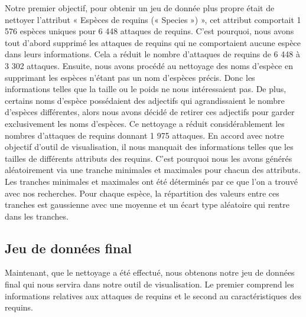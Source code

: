 \documentclass{article}
\begin{document}
Notre premier objectif, pour obtenir un jeu de donnée plus propre était de nettoyer l’attribut « Espèces de requins (« Species ») », cet attribut comportait 1 576 espèces uniques pour 6 448 attaques de requins.
C’est pourquoi, nous avons tout d’abord supprimé les attaques de requins qui ne comportaient aucune espèce dans leurs informations. Cela a réduit le nombre d’attaques de requins de 6 448 à 3 302 attaques.
Ensuite, nous avons procédé au nettoyage des noms d’espèce en supprimant les espèces n’étant pas un nom d’espèces précis. Donc les informations telles que la taille ou le poids ne nous intéressaient pas.
De plus, certains noms d’espèce possédaient des adjectifs qui agrandissaient le nombre d’espèces différentes, alors nous avons décidé de retirer ces adjectifs pour garder exclusivement les noms d’espèces.
Ce nettoyage a réduit considérablement les nombres d’attaques de requins donnant 1 975 attaques.
En accord avec notre objectif d’outil de visualisation, il nous manquait des informations telles que les tailles de différents attributs des requins. C’est pourquoi nous les avons générés aléatoirement via une tranche minimales et maximales pour chacun des attributs. Les tranches minimales et maximales ont été déterminés par ce que l'on a trouvé avec nos recherches. Pour chaque espèce, la répartition des valeurs entre ces tranches est gaussienne avec une moyenne et un écart type aléatoire qui rentre dans les tranches.


\clearpage
\subsection{Jeu de données final}
Maintenant, que le nettoyage a été effectué, nous obtenons notre jeu de données final qui nous servira dans notre outil de visualisation. Le premier comprend les informations relatives aux attaques de requins et le second au caractéristiques des requins.
\end{document}
